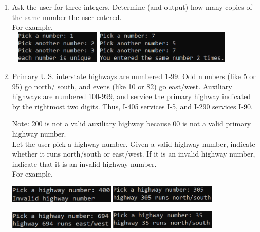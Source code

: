 \documentclass{article}
\begin{document}
\begin{enumerate}
	\item 
		Ask the user for three integers.  Determine (and output) how many copies of the same number 
		the user entered.\\
		For example, \\ \ \hfill
		\includegraphics[height = 0.6in]{./imgs/uniqueIntCount1.PNG} \hfill
		\includegraphics[height = 0.6in]{./imgs/uniqueIntCount2.PNG} \hfill \ 

	
	\item 
		Primary U.S. interstate highways are numbered 1-99.  Odd numbers (like 5 or 95) go north/
		south, and evens (like 10 or 82) go east/west.  Auxiliary highways are numbered 100-999, and 
		service the primary highway indicated by the rightmost two digits.  Thus, I-405 services 
		I-5, and I-290 services I-90.
		
		Note: 200 is not a valid auxiliary highway because 00 is not a valid primary highway 
		number.\\
		
		Let the user pick a highway number.  Given a valid highway number, indicate whether it runs 
		north/south or east/west.  If it is an invalid highway number, indicate that it is an 
		invalid highway number. \\
		For example,
		
		\hfill
		\includegraphics[width = 2in]{./imgs/highwayValidator1.PNG} \hfill
		\includegraphics[width = 2in]{./imgs/highwayValidator2.PNG} \hfill \ 

		\hfill 
		\includegraphics[width = 2in]{./imgs/highwayValidator3.PNG} \hfill 
		\includegraphics[width = 2in]{./imgs/highwayValidator4.PNG} \hfill \ 



\end{enumerate}
\end{document}
